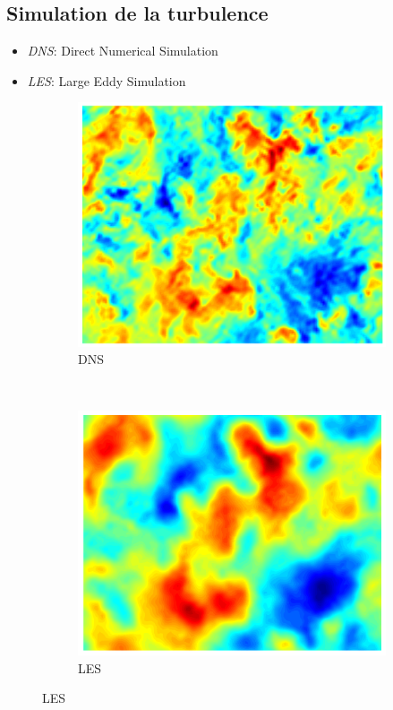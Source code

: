 \documentclass{beamer}
\begin{document}
\subsection{Simulation de la turbulence}
\begin{frame}
  \begin{itemize}
  \item \textit{DNS}: Direct Numerical Simulation
  \item \textit{LES}: Large Eddy Simulation
  \end{itemize}

  \begin{figure}[ht]
  \centering
  \begin{subfigure}[b]{0.5\textwidth}
    \centering
    \includegraphics[scale=0.25]{figures/DNS_Velocity_Field.png}
    \caption{\label{fig:dns} DNS}
  \end{subfigure}%
  ~
  \begin{subfigure}[b]{0.5\textwidth}
    \centering
    \includegraphics[scale=0.25]{figures/DNS_Filtered_Velocity_Field_Large.png}
    \caption{\label{fig:les} LES}
  \end{subfigure}
\end{figure}
\end{frame}
\end{document}
